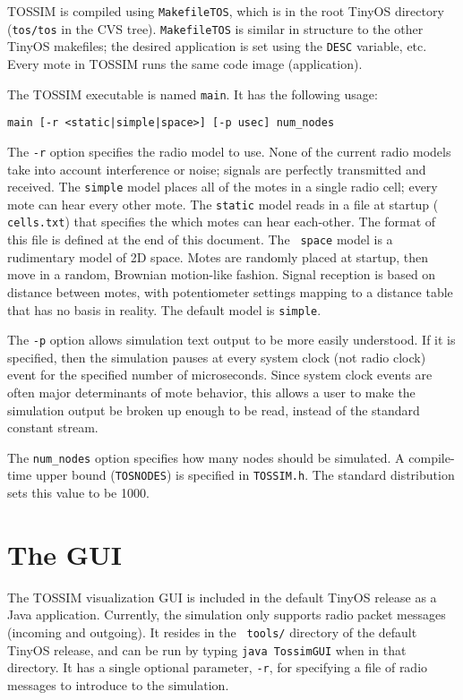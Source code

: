 \documentclass[12pt]{article}
\begin{document}
TOSSIM is compiled using {\tt MakefileTOS}, which is in the root
TinyOS directory ({\tt tos/tos} in the CVS tree). {\tt MakefileTOS} is
similar in structure to the other TinyOS makefiles; the desired
application is set using the {\tt DESC} variable, etc. Every mote in
TOSSIM runs the same code image (application).

The TOSSIM executable is named {\tt main}. It has the following usage:

{\tt main [-r <static|simple|space>] [-p usec] num\_nodes}

The {\tt -r} option specifies the radio model to use. None of the
current radio models take into account interference or noise; signals
are perfectly transmitted and received. The {\tt simple} model places
all of the motes in a single radio cell; every mote can hear every
other mote. The {\tt static} model reads in a file at startup ({\tt
cells.txt}) that specifies the which motes can hear each-other. The
format of this file is defined at the end of this document. The {\tt
space} model is a rudimentary model of 2D space. Motes are randomly
placed at startup, then move in a random, Brownian motion-like
fashion. Signal reception is based on distance between motes, with
potentiometer settings mapping to a distance table that has no basis
in reality. The default model is {\tt simple}.

The {\tt -p} option allows simulation text output to be more easily
understood. If it is specified, then the simulation pauses at every
system clock (not radio clock) event for the specified number of
microseconds. Since system clock events are often major determinants
of mote behavior, this allows a user to make the simulation output be
broken up enough to be read, instead of the standard constant stream.

The {\tt num\_nodes} option specifies how many nodes should be
simulated. A compile-time upper bound ({\tt TOSNODES}) is specified in
{\tt TOSSIM.h}. The standard distribution sets this value to be 1000.

\section*{The GUI}

The TOSSIM visualization GUI is included in the default TinyOS release
as a Java application. Currently, the simulation only supports radio
packet messages (incoming and outgoing). It resides in the {\tt
tools/} directory of the default TinyOS release, and can be run by
typing {\tt java TossimGUI} when in that directory. It has a single
optional parameter, {\tt -r}, for specifying a file of radio messages
to introduce to the simulation.
\end{document}
